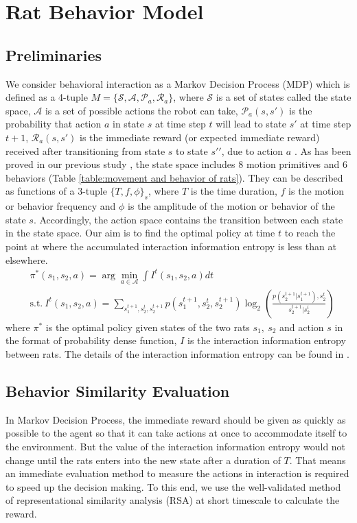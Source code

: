 \section{Rat Behavior Model}
\subsection{Preliminaries}
We consider behavioral interaction as a Markov Decision Process (MDP) which is
defined as a 4-tuple $M=\{\mathcal{S},\mathcal{A},\mathcal{P}_a,\mathcal{R}_a\}$,
where $\mathcal{S}$ is a set of states called the state space, $\mathcal{A}$ is
a set of possible actions the robot can take, $\mathcal{P}_a(s,s{'})$ is the
probability that action $a$ in state $s$ at time step $t$ will lead to state
$s{'}$ at time step $t+1$, $\mathcal{R}_a(s,s{'})$ is the immediate reward (or
expected immediate reward) received after transitioning from state $s$ to state
$s{'}'$, due to action $a$ \cite{MDP}. As has been proved in our previous study
\cite{gao-eng-2022, gao-proc}, the state space includes 8 motion primitives and
6 behaviors (Table \ref{table:movement and behavior of rats}). They can be
described as functions of a 3-tuple $\{T,f,\phi\}_s$, where $T$ is the time
duration, $f$ is the motion or behavior frequency and $\phi$ is the amplitude of
the motion or behavior of the state $s$. Accordingly, the action space contains
the transition between each state in the state space. Our aim is to find the
optimal policy at time $t$ to reach the point at where the accumulated
interaction information entropy is less than at elsewhere.
\begin{equation}\label{eq:objective-function}
\begin{aligned}
  &\pi^*(s_1,s_2,a)=\arg\min_{a\in\mathcal{A}}\int I^t(s_1,s_2,a) dt \\
  &\text{s.t.}~I^t(s_1,s_2,a)=\sum_{s_1^{t+1},s_2^t,s_2^{t+1}}p(s_1^{t+1},s_2^t,
  s_2^{t+1})\log_2(\frac{p(s_2^{t+1}|s_1^{t+1}),s_2^t}{s_2^{t+1}|s_2^i})
\end{aligned}
\end{equation}
where $\pi^*$ is the optimal policy given states of the two rats $s_1,~s_2$ and
action $s$ in the format of probability dense function, $I$ is the interaction
information entropy between rats. The details of the interaction information
entropy can be found in \cite{gao-eng-2022, gao-proc}.

\subsection{Behavior Similarity Evaluation}
In Markov Decision Process, the immediate reward should be given as quickly as
possible to the agent so that it can take actions at once to accommodate itself
to the environment. But the value of the interaction information entropy would
not change until the rats enters into the new state after a duration of $T$.
That means an immediate evaluation method to measure the actions in interaction
is required to speed up the decision making. To this end, we use the
well-validated method of representational similarity analysis (RSA) \cite{rsa}
at short timescale to calculate the reward.

